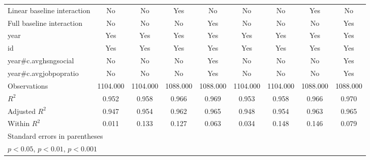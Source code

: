{\begin{tabular}{l*{8}{c}}
\addlinespace
Linear baseline interaction &     {No}         &     {No}         &    {Yes}         &     {No}         &     {No}         &     {No}         &    {Yes}         &     {No}         \\
\addlinespace
Full baseline interaction&     {No}         &     {No}         &     {No}         &    {Yes}         &     {No}         &     {No}         &     {No}         &    {Yes}         \\
\addlinespace
year            &    {Yes}         &    {Yes}         &    {Yes}         &    {Yes}         &    {Yes}         &    {Yes}         &    {Yes}         &    {Yes}         \\
\addlinespace
id              &    {Yes}         &    {Yes}         &    {Yes}         &    {Yes}         &    {Yes}         &    {Yes}         &    {Yes}         &    {Yes}         \\
\addlinespace
year#c.avghsngsocial&     {No}         &     {No}         &     {No}         &    {Yes}         &     {No}         &     {No}         &     {No}         &    {Yes}         \\
\addlinespace
year#c.avgjobpopratio&     {No}         &     {No}         &     {No}         &    {Yes}         &     {No}         &     {No}         &     {No}         &    {Yes}         \\
\midrule
Observations    & 1104.000         & 1104.000         & 1088.000         & 1088.000         & 1104.000         & 1104.000         & 1088.000         & 1088.000         \\
\(R^{2}\)       &    0.952         &    0.958         &    0.966         &    0.969         &    0.953         &    0.958         &    0.966         &    0.970         \\
Adjusted \(R^{2}\)&    0.947         &    0.954         &    0.962         &    0.965         &    0.948         &    0.954         &    0.963         &    0.965         \\
Within \(R^{2}\)&    0.011         &    0.133         &    0.127         &    0.063         &    0.034         &    0.148         &    0.146         &    0.079         \\
\bottomrule
\multicolumn{9}{l}{\footnotesize Standard errors in parentheses}\\
\multicolumn{9}{l}{\footnotesize \sym{*} \(p<0.05\), \sym{**} \(p<0.01\), \sym{***} \(p<0.001\)}\\
\end{tabular}
}
